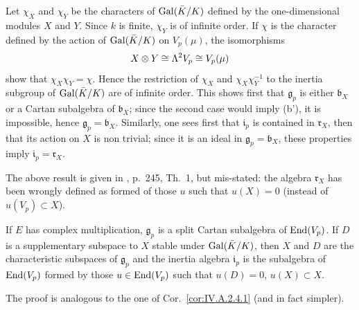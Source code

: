 Let $\chi_X$ and $\chi_Y$ be the characters of $\mathrm{Gal}(\bar K/K)$ defined
by the one-dimensional modules $X$ and $Y$. Since $k$ is finite,
$\chi_Y$ is of infinite order. If $\chi$ is the character defined by the
action of $\mathrm{Gal}(\bar K/K)$ on $V_p(\mu)$, the isomorphisms
\[
X\mathbin{\otimes} Y \cong \Lambda^2V_p \cong V_p(\mu)
\]
show that $\chi_X\chi_Y=\chi$. Hence the restriction of $\chi_X$ and
$\chi_X\chi_Y^{-1}$ to the inertia subgroup of $\mathrm{Gal}(\bar K/K)$ are of
infinite order. This shows first that $\mathfrak{g}_p$ is either
$\mathfrak{b}_X$ or a Cartan subalgebra of $\mathfrak{b}_X$; since the
second case would imply (b'), it is impossible, hence
$\mathfrak{g}_p=\mathfrak{b}_X$. Similarly, one sees first that
$\mathfrak{i}_p$ is contained in $\mathfrak{r}_X$, then that its action
on $X$ is non trivial; since it is an ideal in
$\mathfrak{g}_p=\mathfrak{b}_X$, these properties imply
$\mathfrak{i}_p=\mathfrak{r}_X$.


The above result is given in \cite{serre-lieg}, p.~245, Th.~1, but
mis-stated: the algebra $\mathfrak{r}_X$ has been wrongly defined as
formed of those $u$ such that $u(X)=0$ (instead of $u(V_p)\subset X$).

\begin{corollary}[2]\label{cor:IV.A.2.4.2}
If $E$ has complex multiplication, $\mathfrak{g}_p$ is a split Cartan
subalgebra of $\mathrm{End}(V_p)$. If $D$ is a supplementary subspace to $X$
stable under $\mathrm{Gal}(\bar K/K)$, then $X$ and $D$ are the characteristic
subspaces of $\mathfrak{g}_p$ and the inertia algebra $\mathfrak{i}_p$
is the subalgebra of $\mathrm{End}(V_p)$ formed by those $u\in\mathrm{End}(V_p)$ such
that $u(D)=0$, $u(X)\subset X$.
\end{corollary}

The proof is analogous to the one of Cor.~\ref{cor:IV.A.2.4.1} (and in
fact simpler).
